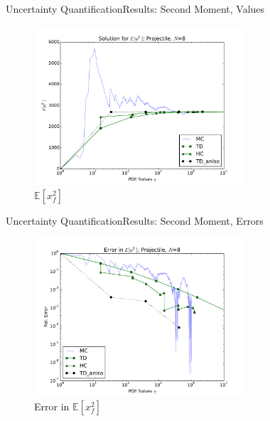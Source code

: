 \documentclass{beamer}
\newcommand{\expv}[1]{\ensuremath{\mathbb{E}[ #1]}}
\begin{document}
\begin{frame}{Uncertainty Quantification}{Results: Second Moment, Values}
  \begin{figure}[h!]
    \centering
      \includegraphics[width=0.7\textwidth]{../graphics/projectile_solns_aniso_variance}
      \caption{$\expv{x_f^2}$}
  \end{figure}
\end{frame}

\begin{frame}{Uncertainty Quantification}{Results: Second Moment, Errors}
  \begin{figure}[h!]
    \centering
      \includegraphics[width=0.7\textwidth]{../graphics/projectile_errs_aniso_variance}
      \caption{Error in $\expv{x_f^2}$}
  \end{figure}
\end{frame}
\end{document}
